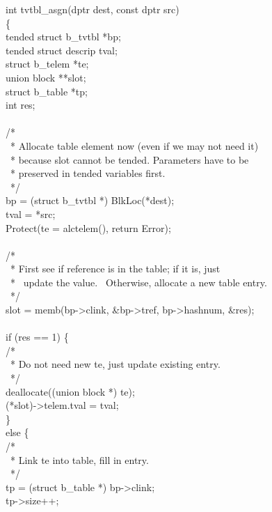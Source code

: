 \begin{iconcode}
int tvtbl\_asgn(dptr dest, const dptr src)\\
\{\\
\>tended struct b\_tvtbl *bp;\\
\>tended struct descrip tval;\\
\>struct b\_telem *te;\\
\>union block **slot;\\
\>struct b\_table *tp;\\
\>int res;\\
\\
\>/*\\
\>\ * Allocate table element now (even if we may not need it)\\
\>\ * because slot cannot be tended. Parameters have to be\\
\>\ * preserved in tended variables first.\\
\>\ */\\
\>bp = (struct b\_tvtbl *) BlkLoc(*dest);\\
\>tval = *src;\\
\>Protect(te = alctelem(), return Error);\\
\\
\>/*\\
\>\ * First see if reference is in the table; if it is, just \\
\>\ * \ update the value. \ Otherwise, allocate a new table entry.\\
\>\ */\\
\>slot = memb(bp->clink, \&bp->tref, bp->hashnum, \&res);\\
\\
\>if (res == 1) \{\\
\>\>/*\\
\>\>\ * Do not need new te, just update existing entry.\\
\>\>\ */\\
\>\>deallocate((union block *) te);\\
\>\>(*slot)->telem.tval = tval;\\
\>\>\}\\
\>else \{\\
\>\>/*\\
\>\>\ * Link te into table, fill in entry.\\
\>\>\ */\\
\>\>tp = (struct b\_table *) bp->clink;\\
\>\>tp->size++;\\
\\

\end{iconcode}
